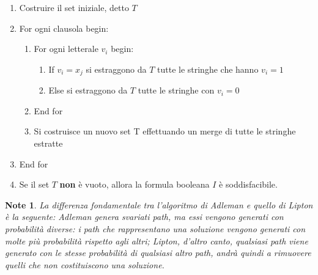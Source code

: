 \documentclass[12pt,a4paper]{report}
\newtheorem{note}{Note}[section]
\begin{document}
\begin{enumerate}
\item Costruire il set iniziale, detto $T$
\item For ogni clausola begin:
\begin{enumerate}
\item For ogni letterale $v_{i}$ begin:
\begin{enumerate}
\item If $v_{i} = x_{j}$ si estraggono da $T$ tutte le stringhe che hanno $v_{i} = 1$
\item Else si estraggono da $T$ tutte le stringhe con $v_{i} = 0$
\end{enumerate}
\item End for
\item Si costruisce un nuovo set T effettuando un merge di tutte le stringhe estratte
\end{enumerate}
\item End for
\item Se il set $T$ \textbf{non} è vuoto, allora la formula booleana $I$ è soddisfacibile.
\end{enumerate}

\begin{note}
La differenza fondamentale tra l'algoritmo di Adleman e quello di Lipton è la seguente: Adleman genera svariati path, ma essi vengono generati con probabilità diverse: i path che rappresentano una soluzione vengono generati con molte più probabilità rispetto agli altri; Lipton, d'altro canto, qualsiasi path viene generato con le stesse probabilità di qualsiasi altro path, andrà quindi a rimuovere quelli che non costituiscono una soluzione.
\end{note}
\end{document}
